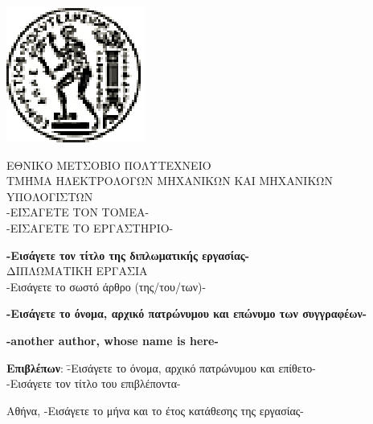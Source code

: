 \documentclass[12pt, twoside, a4paper]{report}
\begin{document}
\addtolength{\topmargin}{-0.5in}
\thispagestyle{empty}
\vspace{-8ex}
\begin{center}
\includegraphics[scale=1]{figures/pyrforos.eps}
\end{center}
\begin{center}
\Large{Ε}\large{ΘΝΙΚO}
\Large{Μ}\large{ΕΤΣOΒΙΟ}
\Large{Π}\large{ΟΛΥΤΕΧΝΕIΟ} \\
\normalsize{Τ}\small{ΜΉΜΑ}
\normalsize{H}\small{ΛΕΚΤΡΟΛΟΓΩΝ}
\normalsize{M}\small{ΗΧΑΝΙΚΩΝ}
\normalsize{K}\small{AI}
\normalsize{M}\small{ΗΧΑΝΙΚΩΝ}
\normalsize{Y}\small{ΠΟΛΟΓΙΣΤΩΝ} \\
\vspace{2ex}
-ΕΙΣΑΓΕΤΕ ΤΟΝ ΤΟΜΕΑ- \\
-ΕΙΣΑΓΕΤΕ ΤΟ ΕΡΓΑΣΤΗΡΙΟ- \\
\end{center}
\begin{center}
\vspace{8ex}
\large \textbf{-Εισάγετε τον τίτλο της διπλωματικής εργασίας-} \\
\vspace{10ex}
\large
ΔΙΠΛΩΜΑΤΙΚΗ ΕΡΓΑΣΙΑ\\
\vspace{2ex}
\normalsize
-Εισάγετε το σωστό άρθρο (της/του/των)- \\
\end{center}
\vspace{2ex}
\begin{center}
\parbox[c]{0.4\textwidth} { \center\textbf{
-Εισάγετε το όνομα, αρχικό πατρώνυμου και επώνυμο των συγγραφέων- }}
\parbox[c]{0.4\textwidth} { \center\textbf{
	-another author, whose name is here- }}
\vspace{10ex}
\end{center}
\begin{tabbing}
	\textbf{Επιβλέπων}: \= -Εισάγετε το όνομα, αρχικό πατρώνυμου
				και επίθετο- \\
			    \> -Εισάγετε τον τίτλο του επιβλέποντα-
\end{tabbing}
\begin{center}
\normalsize
Αθήνα, -Εισάγετε το μήνα και το έτος κατάθεσης της εργασίας-
\end{center}
\end{document}
